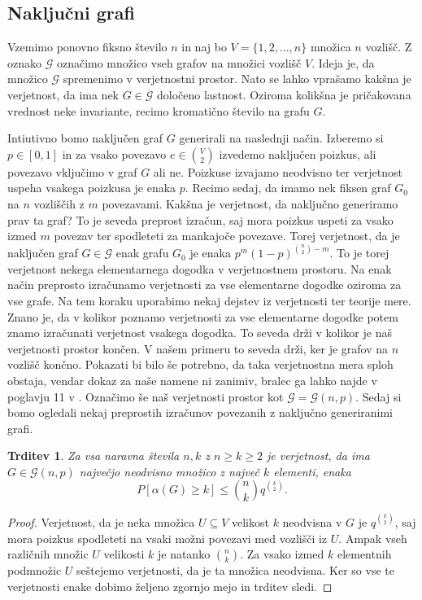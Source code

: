 \documentclass[12pt,a4paper,twoside]{article}
\theoremstyle{definition} %
\theoremstyle{plain} %
\newtheorem{trditev}[definicija]{Trditev}
\numberwithin{equation}{section}  %
\begin{document}
\subsection{Naključni grafi}
Vzemimo ponovno fiksno število $n$ in naj bo $V = \{1,2, \ldots, n\}$ množica $n$ vozlišč. Z oznako $\mathcal{G}$ označimo množico vseh grafov na množici vozlišč $V$.  Ideja je, da množico $\mathcal{G}$ spremenimo v verjetnostni prostor. Nato se lahko vprašamo kakšna je verjetnost, da ima nek $G \in \mathcal{G}$ določeno lastnost. Oziroma kolikšna je pričakovana vrednost neke invariante, recimo kromatično število na grafu $G$.

Intiutivno bomo naključen graf $G$ generirali na naslednji način. Izberemo si $p \in [0, 1]$ in za vsako povezavo $e \in {V \choose 2}$ izvedemo naključen poizkus, ali povezavo vključimo v graf $G$ ali ne. Poizkuse izvajamo neodvisno ter verjetnost uspeha vsakega poizkusa je enaka $p$. Recimo sedaj, da imamo nek fiksen graf $G_0$ na $n$ vozliščih z $m$ povezavami. Kakšna je verjetnost, da naključno generiramo prav ta graf? To je seveda preprost izračun, saj mora poizkus uspeti za vsako izmed $m$ povezav ter spodleteti za mankajoče povezave. Torej verjetnost, da je naključen graf $G \in \mathcal{G}$ enak grafu $G_0$ je enaka  $p^m (1-p)^{{n \choose 2} - m}$. To je torej verjetnost nekega elementarnega dogodka v verjetnostnem prostoru. Na enak način preprosto izračunamo verjetnosti za vse elementarne dogodke oziroma za vse grafe. Na tem koraku uporabimo nekaj dejstev iz verjetnosti ter teorije mere. Znano je, da v kolikor poznamo verjetnosti za vse elementarne dogodke potem znamo izračunati verjetnost vsakega dogodka. To seveda drži v kolikor je naš verjetnosti prostor končen. V našem primeru to seveda drži, ker je grafov na $n$ vozlišč končno. Pokazati bi bilo še potrebno, da taka verjetnostna mera sploh obstaja, vendar dokaz za naše namene ni zanimiv, bralec ga lahko najde v poglavju 11 v \cite{maingraph}. Označimo še naš verjetnosti prostor kot $\mathcal{G} = \mathcal{G}(n, p)$. Sedaj si bomo ogledali nekaj preprostih izračunov povezanih z naključno generiranimi grafi.

\begin{trditev}
\label{indeprand}
Za vsa naravna števila $n,k$ z $n \ge k \ge 2$ je verjetnost, da ima $G \in \mathcal{G}(n,p)$ največjo neodvisno množico z največ $k$ elementi, enaka
$$ P[\alpha(G) \ge k] \le {n \choose k} q ^{k \choose 2} .$$
\end{trditev}

\begin{proof}
Verjetnost, da je neka množica $U \subseteq V$ velikost $k$ neodvisna v $G$ je $q^{k \choose 2}$, saj mora poizkus spodleteti na vsaki možni povezavi med vozlišči iz $U$. Ampak vseh različnih množic $U$ velikosti $k$ je natanko ${n \choose k}$. Za vsako izmed $k$ elementnih podmnožic $U$ seštejemo verjetnosti, da je ta množica neodvisna. Ker so vse te verjetnosti enake dobimo željeno zgornjo mejo in trditev sledi.
\end{proof}
\end{document}
